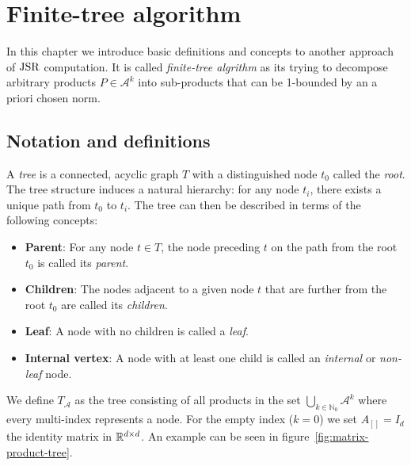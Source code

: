 
\chapter{Finite-tree algorithm}
\label{ch:finite-tree}
In this chapter we introduce basic definitions and concepts to another approach of $\operatorname{JSR}$ computation. It is called \emph{finite-tree algrithm} as its trying to decompose arbitrary products $P \in \mathcal{A}^k$ into sub-products that can be 1-bounded by an a priori chosen norm.  

\section{Notation and definitions}

\begin{definition}
    A \emph{tree} is a connected, acyclic graph \( T \) with a distinguished node \( t_0\) called the \emph{root}. The tree structure induces a natural hierarchy: for any node $t_i$, there exists a unique path from \( t_0 \) to \( t_i \). The tree can then be described in terms of the following concepts:
    \begin{itemize}
        \item \textbf{Parent}: For any node \( t \in T \), the node preceding \( t \) on the path from the root $t_0$ is called its \emph{parent}.
        \item \textbf{Children}: The nodes adjacent to a given node \( t \) that are further from the root $t_0$ are called its \emph{children}.
        \item \textbf{Leaf}: A node with no children is called a \emph{leaf}.
        \item \textbf{Internal vertex}: A node with at least one child is called an \emph{internal} or \emph{non-leaf} node.
    \end{itemize}
\end{definition}

 We define $T_{\mathcal{A}}$ as the tree consisting of all products in the set $\bigcup \limits_ {k \in \mathbb{N}_0}\mathcal{A}^k$ where every multi-index represents a node. For the empty index ($k = 0$)  we set $A_{[]} = I_d$ the identity matrix in $\mathbb{R}^{d\times d}$. An example can be seen in figure~\ref{fig:matrix-product-tree}.

